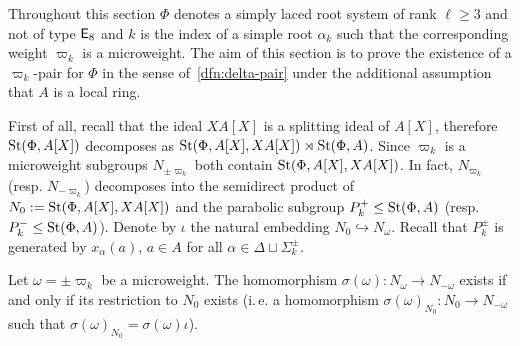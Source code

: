 Throughout this section $\Phi$ denotes a simply laced root system of rank $\ell \geq 3$ and not of type $\mathsf{E}_8$ and $k$ is the index of
 a simple root $\alpha_k$ such that the corresponding weight $\varpi_k$ is a microweight.
The aim of this section is to prove the existence of a $\varpi_k$-pair for $\Phi$ in the sense of~\cref{dfn:delta-pair}
 under the additional assumption that $A$ is a local ring.

First of all, recall that the ideal $XA[X]$ is a splitting ideal of $A[X]$, therefore
$\operatorname{St}(\Phi, A[X])$ decomposes as $\operatorname{St}(\Phi, A[X], XA[X]) \rtimes \operatorname{St}(\Phi, A)$.
Since $\varpi_k$ is a microweight subgroups $N_{\pm \varpi_k}$ both contain $\operatorname{St}(\Phi, A[X], XA[X])$.
In fact, $N_{\varpi_k}$ (resp. $N_{-\varpi_k}$) decomposes into the semidirect product of $N_0 := \operatorname{St}(\Phi, A[X], XA[X])$ and the parabolic subgroup $P_k^+ \leq \operatorname{St}(\Phi, A)$ (resp. $P_k^-\leq \operatorname{St}(\Phi, A)$).
Denote by $\iota$ the natural embedding $N_0 \hookrightarrow N_\omega$.
Recall that $P_k^\pm$ is generated by $x_\alpha(a)$, $a \in A$ for all $\alpha \in \Delta \sqcup \Sigma^\pm_k$.

\begin{lemma} \label{lem:first-reduction}
Let $\omega = \pm \varpi_k$ be a microweight.
The homomorphism $\sigma(\omega)\colon N_\omega \to N_{-\omega}$ exists if and only if its restriction to $N_0$ exists
 (i.\,e. a homomorphism $\sigma(\omega)_{N_0} \colon N_0 \to N_{-\omega}$ such that $\sigma(\omega)_{N_0} = \sigma(\omega) \iota$).
\end{lemma}

